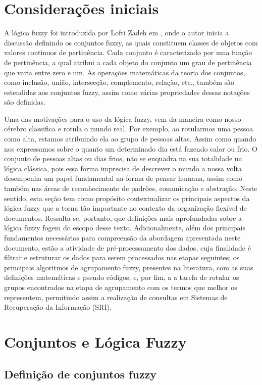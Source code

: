 \section{Considerações iniciais}
A lógica fuzzy foi introduzida por Lofti Zadeh em \cite{Zadeh1965}, onde o autor inicia a discussão definindo os
conjuntos fuzzy, as quais constituem classes de objetos com valores contínuos de pertinência. Cada conjunto é
caracterizado por uma função de pertinência, a qual atribui a cada objeto do conjunto um grau
de pertinência que varia entre zero e um. As operações matemáticas da teoria dos conjuntos, como
inclusão, união, intersecção, complemento, relação, etc., também são estendidas aos conjuntos fuzzy,
assim como várias propriedades dessas notações são definidas.

Uma das motivações para o uso da lógica fuzzy, vem da maneira como nosso cérebro classifica e rotula o mundo
real. Por exemplo, ao rotularmos uma pessoa como alta, estamos atribuindo ela ao grupo de pessoas
altas. Assim como quando nos expressamos sobre o quanto um determinado dia está fazendo calor ou
frio. O conjunto de pessoas altas ou dias frios, não se enquadra na sua totalidade na lógica
clássica, pois essa forma imprecisa de descrever o mundo a nossa volta desempenha um papel
fundamental na forma de pensar humana, assim como também nas áreas de reconhecimento de padrões,
comunicação e abstração\cite{Zadeh1965}.  Neste sentido, esta seção tem como propósito contextualizar os
principais aspectos da lógica fuzzy que a torna tão importante no contexto da organização flexível
de documentos. Ressalta-se, portanto, que definições mais aprofundadas sobre a lógica fuzzy fogem do escopo desse texto.
Adicionalmente, além dos principais fundamentos necessários para compreensão da abordagem apresentada neste documento, estão a atividade de
pré-processamento dos dados, cuja finalidade é filtrar e estruturar os dados para serem processados
nas etapas seguintes; os principais algoritmos de agrupamento fuzzy,
presentes na literatura, com as suas definições matemáticas e pseudo códigos; e, por fim, a
a tarefa de rotular os grupos encontrados na etapa de agrupamento com os termos que melhor os
representem, permitindo assim a realização de consultas em Sistemas de Recuperação da Informação
(SRI).

\section{Conjuntos e Lógica Fuzzy}

\subsection{Definição de conjuntos fuzzy}

